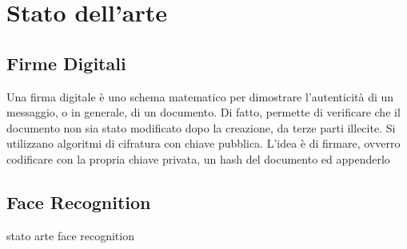 \section{Stato dell'arte}
\subsection{Firme Digitali}
Una firma digitale è uno schema matematico per dimostrare l'autenticità di un messaggio, o in generale, di un documento. Di fatto, permette di verificare che il documento non sia stato modificato dopo la creazione, da terze parti illecite.
Si utilizzano algoritmi di cifratura con chiave pubblica. L'idea è di firmare, ovverro codificare con la propria chiave privata, un hash del documento ed appenderlo
\subsection{Face Recognition}
stato arte face recognition
